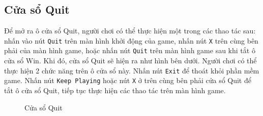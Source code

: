 \subsection{Cửa sổ Quit}
Để mở ra ô cửa sổ Quit, người chơi có thể thực hiện một trong các thao tác sau: nhấn vào nút \verb|Quit| trên màn hình khởi động của game, nhấn nút \verb|X| trên cùng bên phải của màn hình game, hoặc nhấn nút \verb|Quit| trên màn hình game sau khi tắt ô cửa sổ Win. Khi đó, cửa sổ Quit sẽ hiện ra như hình bên dưới. Người chơi có thể thực hiện 2 chức năng trên ô cửa sổ này. Nhấn nút \verb|Exit| để thoát khỏi phần mềm game. Nhấn nút \verb|Keep Playing| hoặc nút \verb|X| ở trên cùng bên phải cửa sổ Quit để tắt ô cửa sổ Quit, tiếp tục thực hiện các thao tác trên màn hình game.
\begin{figure}[H]
\caption{Cửa sổ Quit}
\end{figure}